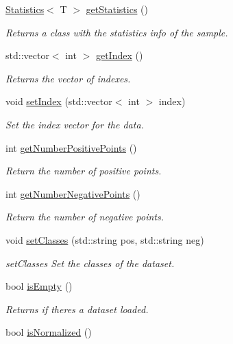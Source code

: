 \begin{DoxyCompactItemize}
\hyperlink{class_statistics}{Statistics}$<$ T $>$ \hyperlink{class_data_a7ca936cd8cbde912283f5feee441717a}{get\+Statistics} ()
\begin{DoxyCompactList}\small\item\em Returns a class with the statistics info of the sample. \end{DoxyCompactList}\item 
std\+::vector$<$ int $>$ \hyperlink{class_data_a9f64e56cea5be1f29eea9319716a3ed1}{get\+Index} ()
\begin{DoxyCompactList}\small\item\em Returns the vector of indexes. \end{DoxyCompactList}\item 
void \hyperlink{class_data_a3e03ebfa95d7d90d4ee3b024af7b18de}{set\+Index} (std\+::vector$<$ int $>$ index)
\begin{DoxyCompactList}\small\item\em Set the index vector for the data. \end{DoxyCompactList}\item 
int \hyperlink{class_data_a627911f72bc1ccc3a096b531772ccb8c}{get\+Number\+Positive\+Points} ()
\begin{DoxyCompactList}\small\item\em Return the number of positive points. \end{DoxyCompactList}\item 
int \hyperlink{class_data_a9494572e8a2bc92fb4c10087cf35e4be}{get\+Number\+Negative\+Points} ()
\begin{DoxyCompactList}\small\item\em Return the number of negative points. \end{DoxyCompactList}\item 
void \hyperlink{class_data_a6d29f9fc923c3f7c258b93330130f056}{set\+Classes} (std\+::string pos, std\+::string neg)
\begin{DoxyCompactList}\small\item\em set\+Classes Set the classes of the dataset. \end{DoxyCompactList}\item 
bool \hyperlink{class_data_a8b96bf083edf16dd41031c254d32e143}{is\+Empty} ()
\begin{DoxyCompactList}\small\item\em Returns if there\textquotesingle{}s a dataset loaded. \end{DoxyCompactList}\item 
bool \hyperlink{class_data_a6b91ca6585e8638f1b359a6f2bb827d7}{is\+Normalized} ()

\end{DoxyCompactItemize}
